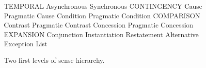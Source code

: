 \begin{figure}
    \centering
    \begin{outline}
        \1 TEMPORAL
            \2 Asynchronous
            \2 Synchronous
        \1 CONTINGENCY
            \2 Cause
            \2 Pragmatic Cause
            \2 Condition
            \2 Pragmatic Condition
        \1 COMPARISON
            \2 Contrast
            \2 Pragmatic Contrast
            \2 Concession
            \2 Pragmatic Concession
        \1 EXPANSION
            \2 Conjunction
            \2 Instantiation
            \2 Restatement
            \2 Alternative
            \2 Exception
            \2 List
    \end{outline}
    \caption{Two first levels of sense hierarchy.}
\end{figure}
